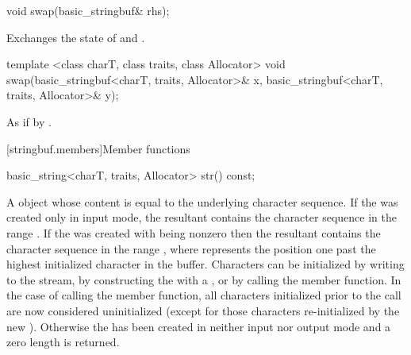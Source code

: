 %
\begin{itemdecl}
void swap(basic_stringbuf& rhs);
\end{itemdecl}

\begin{itemdescr}
\pnum
\effects Exchanges the state of 
and .
\end{itemdescr}

%
\begin{itemdecl}
template <class charT, class traits, class Allocator>
  void swap(basic_stringbuf<charT, traits, Allocator>& x,
            basic_stringbuf<charT, traits, Allocator>& y);
\end{itemdecl}

\begin{itemdescr}
\pnum
\effects As if by .
\end{itemdescr}

[stringbuf.members]{Member functions}

%
\begin{itemdecl}
basic_string<charT, traits, Allocator> str() const;
\end{itemdecl}

\begin{itemdescr}
\pnum
\returns
A
object whose content is equal to the
underlying character sequence.
If the  was created only in input mode, the resultant
 contains the character sequence in the range
. If the  was created with
 being nonzero then the resultant 
contains the character sequence in the range , where
 represents the position one past the highest initialized character
in the buffer. Characters can be initialized by writing to the stream, by constructing
the  with a , or by calling the
 member function. In the case of calling the
 member function, all characters initialized prior to
the call are now considered uninitialized (except for those characters re-initialized
by the new ). Otherwise the  has been created
in neither input nor output mode and a zero length  is returned. 
\end{itemdescr}

